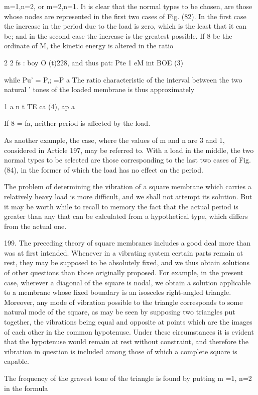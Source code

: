 m=1,n=2, or m=2,n=1. It is clear that the normal types to be chosen, are
those whose nodes are represented in the first two cases of Fig. (82).
In the first case the increase in the period due to the load is zero,
which is the least that it can be; and in the second case the increase
is the greatest possible. If 8 be the ordinate of M, the kinetic energy
is altered in the ratio

2 2 fs : boy O (t)228, and thus pat: Pte 1 eM int BOE (3)


while Pu' = P,; =P a The ratio characteristic of the interval between
the two natural ' tones of the loaded membrane is thus approximately

1 a n t TE ca (4), ap a

If 8 = fa, neither period is affected by the load.

As another example, the case, where the values of m and n are 3 and 1,
considered in Article 197, may be referred to. With a load in the
middle, the two normal types to be selected are those corresponding to
the last two cases of Fig. (84), in the former of which the load has no
effect on the period.

The problem of determining the vibration of a square membrane which
carries a relatively heavy load is more difficult, and we shall not
attempt its solution. But it may be worth while to recall to memory the
fact that the actual period is greater than any that can be calculated
from a hypothetical type, which differs from the actual one.

199. The preceding theory of square membranes includes a good deal more
than was at first intended. Whenever in a vibrating system certain parts
remain at rest, they may be supposed to be absolutely fixed, and we thus
obtain solutions of other questions than those originally proposed. For
example, in the present case, wherever a diagonal of the square is
nodal, we obtain a solution applicable to a membrane whose fixed
boundary is an isosceles right-angled triangle. Moreover, any mode of
vibration possible to the triangle corresponds to some natural mode of
the square, as may be seen by supposing two triangles put together, the
vibrations being equal and opposite at points which are the images of
each other in the common hypotenuse. Under these circumstances it is
evident that the hypotenuse would remain at rest without constraint, and
therefore the vibration in question is included among those of which a
complete square is capable.

The frequency of the gravest tone of the triangle is found by putting m
=1, n=2 in the formula

